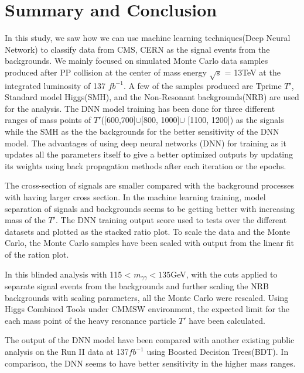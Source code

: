 \chapter{\label{summary}Summary and Conclusion}
In this study, we saw how we can use machine learning techniques(Deep Neural Network)  to classify data from CMS, CERN as the signal events from the backgrounds. We mainly focused on simulated Monte Carlo data samples produced after PP collision at the center of mass energy $\sqrt{s}$ = 13TeV at the integrated luminosity of 137 $fb^{-1}$. A few of the samples produced are Tprime $T'$, Standard model Higgs(SMH), and the Non-Resonant backgrounds(NRB) are used for the analysis. The DNN model training has been done for three different ranges of mass points of $T'$([600,700]$\cup$[800, 1000]$\cup$ [1100, 1200]) as the signals while the SMH as the the backgrounds for the better sensitivity of the DNN model. The advantages of using deep neural networks (DNN) for training  as it updates all the parameters itself to give a better optimized outputs by updating its weights using back propagation methods after each iteration or the epochs.

The cross-section of signals are smaller compared with the background processes with having larger cross section. In the machine learning training, model separation of signals and backgrounds seems to be getting better with increasing mass of the $T'$.  The DNN training output score used to tests over the different datasets and plotted as the stacked ratio plot. To scale the data and the Monte Carlo, the Monte Carlo samples have been scaled with output from the linear fit of the ration plot.  

In this blinded analysis with 115 < $m_{\gamma\gamma}< 135$GeV, with the cuts applied to separate signal events from the backgrounds and further scaling the NRB backgrounds with scaling parameters, all the Monte Carlo were rescaled. Using Higgs Combined Tools under CMMSW environment, the expected limit for the each mass point of the heavy resonance particle $T'$ have been calculated. 

 The output of the DNN model have been compared with another existing public analysis on the Run II data at 137$fb^{-1}$ using Boosted Decision Trees(BDT). In comparison, the DNN seems to have better sensitivity in the higher mass ranges.


